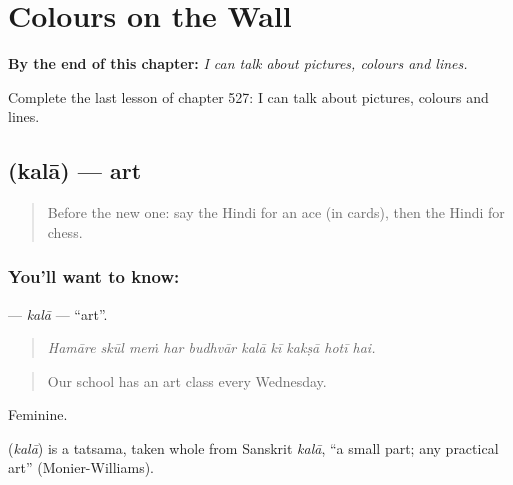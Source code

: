 
\chapter{Colours on the Wall}
\label{ch:hi-colours-on-the-wall}

\begin{chapteropening}
\textbf{By the end of this chapter:} \emph{I can talk about pictures, colours and lines.}

Complete the last lesson of chapter 527: I can talk about pictures, colours and lines.
\end{chapteropening}

\section[\texorpdfstring{\hi{कला} (kalā)}{कला (kalā)}]{ (kalā) — art}

\label{lesson:HI-C527-kala}



\begin{quote}
Before the new one: say the Hindi for an ace (in cards), then the Hindi for chess.
\end{quote}

\subsection*{You'll want to know: }
\textbf{} — \emph{kalā} — \textquotedblleft{}art\textquotedblright{}.

\begin{quote}
         
\end{quote}

\begin{quote}
\emph{Hamāre skūl meṁ har budhvār kalā kī kakṣā hotī hai.}
\end{quote}

\begin{quote}
Our school has an art class every Wednesday.
\end{quote}

Feminine.

\begin{cousinweb}
\textbf{} (\emph{kalā}) is a tatsama, taken whole from Sanskrit \emph{kalā}, \textquotedblleft{}a small part; any practical art\textquotedblright{} (Monier-Williams).
\end{cousinweb}

